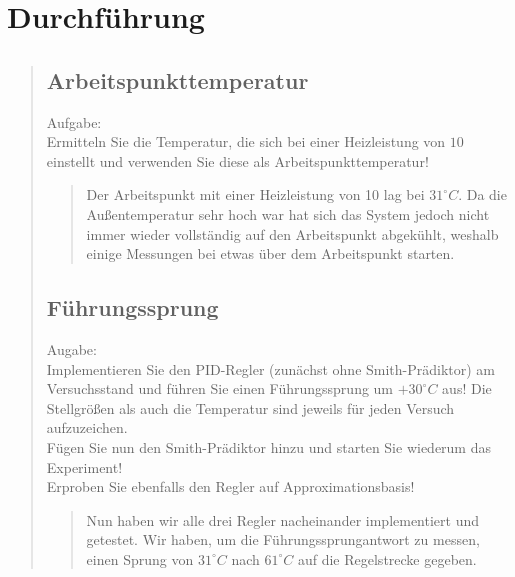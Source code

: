\section{Durchführung}
\begin{quote}
    
    
    \subsection{Arbeitspunkttemperatur}
    \begin{quote}
        
    \end{quote}
    Aufgabe:\\
    Ermitteln Sie die Temperatur, die sich bei einer Heizleistung von $10$ einstellt und verwenden Sie diese als
    Arbeitspunkttemperatur!\vspace{1em}
    
    \begin{quote}
        
        Der Arbeitspunkt mit einer Heizleistung von 10 lag bei $31^{\circ} C$. Da die Außentemperatur sehr hoch war hat
        sich das System jedoch nicht immer wieder vollständig auf den Arbeitspunkt abgekühlt, weshalb einige Messungen
        bei etwas über dem Arbeitspunkt starten.\\
        
        
    \end{quote}
    
    
    
    \subsection{Führungssprung}
    
    Augabe:\\
    Implementieren Sie den PID-Regler (zunächst ohne Smith-Prädiktor) am Versuchsstand und führen Sie einen
    Führungssprung um $+30^{\circ} C$ aus! Die Stellgrößen als auch die Temperatur sind jeweils für jeden Versuch
    aufzuzeichen.\\
    Fügen Sie nun den Smith-Prädiktor hinzu und starten Sie wiederum das Experiment!\\
    Erproben Sie ebenfalls den Regler auf Approximationsbasis!\vspace{1em}
    
    
    
    \begin{quote}
        Nun haben wir alle drei Regler nacheinander implementiert und getestet. Wir haben, um die Führungssprungantwort zu
        messen, einen Sprung von $31^{\circ} C$ nach $61^{\circ} C$ auf die Regelstrecke gegeben.\\
        

\end{quote}
\end{quote}

